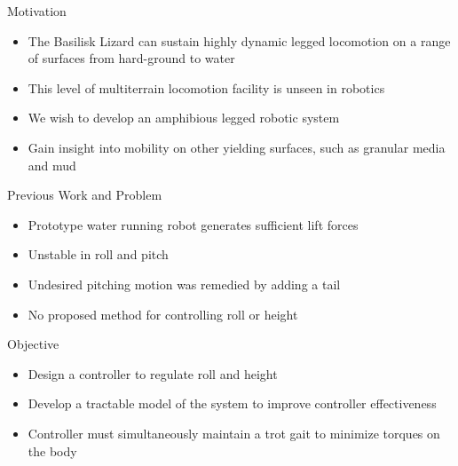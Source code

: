 \textcolor{prime}{\textsf{Motivation}}
\begin{itemize}
	\item The Basilisk Lizard can sustain highly dynamic legged locomotion on a range of surfaces from hard-ground to water~\cite{glasheen1996hydrodynamic}
	\item This level of multiterrain locomotion facility is unseen in robotics
    \item We wish to develop an amphibious legged robotic system
    \item Gain insight into mobility on other yielding surfaces, such as granular media and mud
\end{itemize} 
\vspace{2EX}

\textcolor{prime}{\textsf{Previous Work and Problem}}
\begin{itemize}
    \item Prototype water running robot generates sufficient lift forces
    \item Unstable in roll and pitch
    \item Undesired pitching motion was remedied by adding a tail~\cite{park2010roll}
    \item No proposed method for controlling roll or height
\end{itemize}
\vspace{2EX}

\textcolor{prime}{\textsf{Objective}}
\begin{itemize}
	\item Design a controller to regulate roll and height 
    \item Develop a tractable model of the system to improve controller effectiveness
	\item Controller must simultaneously maintain a trot gait to minimize torques on the body
\end{itemize}
\vspace{-1in}

